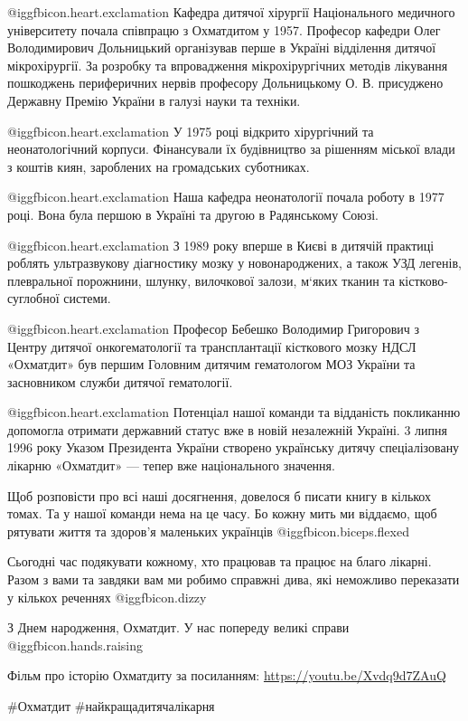 @igg{fbicon.heart.exclamation} Кафедра дитячої хірургії Національного медичного
університету почала співпрацю з Охматдитом у 1957. Професор кафедри Олег
Володимирович Дольницький організував перше в Україні відділення дитячої
мікрохірургії. За розробку та впровадження мікрохірургічних методів лікування
пошкоджень периферичних нервів професору Дольницькому О. В. присуджено Державну
Премію України в галузі науки та техніки. 

@igg{fbicon.heart.exclamation} У 1975 році відкрито хірургічний та
неонатологічний корпуси. Фінансували їх будівництво за рішенням міської влади з
коштів киян, зароблених на громадських суботниках.

@igg{fbicon.heart.exclamation} Наша кафедра неонатології почала роботу в 1977
році. Вона була першою в Україні та другою в Радянському Союзі.

@igg{fbicon.heart.exclamation} З 1989 року вперше в Києві в дитячій практиці
роблять ультразвукову діагностику мозку у новонароджених, а також УЗД легенів,
плевральної порожнини, шлунку, вилочкової залози, м‘яких тканин та
кістково-суглобної системи.

@igg{fbicon.heart.exclamation} Професор Бебешко Володимир Григорович з Центру
дитячої онкогематології та трансплантації кісткового мозку НДСЛ «Охматдит» був
першим Головним дитячим гематологом МОЗ України та засновником служби дитячої
гематології. 

@igg{fbicon.heart.exclamation} Потенціал нашої команди та відданість покликанню
допомогла отримати державний статус вже в новій незалежній Україні. 3 липня
1996 року Указом Президента України створено українську дитячу спеціалізовану
лікарню «Охматдит» — тепер вже національного значення.

Щоб розповісти про всі наші досягнення, довелося б писати книгу в кількох
томах. Та у нашої команди нема на це часу. Бо кожну мить ми віддаємо, щоб
рятувати життя та здоров’я маленьких українців @igg{fbicon.biceps.flexed} 

Сьогодні час подякувати кожному, хто працював та працює на благо лікарні. Разом
з вами та завдяки вам ми робимо справжні дива, які неможливо переказати у
кількох реченнях  @igg{fbicon.dizzy} 

З Днем народження, Охматдит. У нас попереду великі справи  @igg{fbicon.hands.raising} 

Фільм про історію Охматдиту за посиланням: \url{https://youtu.be/Xvdq9d7ZAuQ}

\#Охматдит \#найкращадитячалікарня
